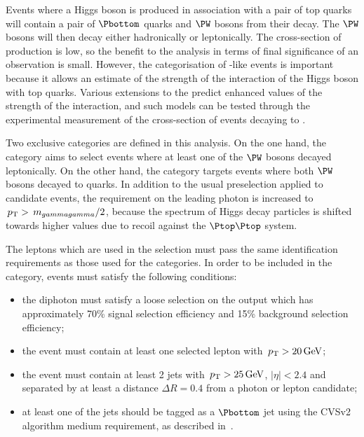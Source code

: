 Events where a Higgs boson is produced in association with a pair of top quarks will contain a pair of $\Pbottom$ quarks and $\PW$ bosons from their decay. The $\PW$ bosons will then decay either hadronically or leptonically. The cross-section of \ttH production is low, so the benefit to the analysis in terms of final significance of an observation is small. However, the categorisation of \ttH-like events is important because it allows an estimate of the strength of the interaction of the Higgs boson with top quarks. Various extensions to the \SM predict enhanced values of the strength of the \ttH interaction, and such models can be tested through the experimental measurement of the cross-section of \ttH events decaying to \Hgg.

Two exclusive \TTHTag categories are defined in this analysis. On the one hand, the \TTHLeptonicTag category aims to select \ttH events where at least one of the $\PW$ bosons decayed leptonically. On the other hand, the \TTHHadronicTag category targets events where both $\PW$ bosons decayed to quarks. In addition to the usual preselection applied to candidate events, the requirement on the leading photon \pT is increased to $\,p_\text{T}>\,m_{gammagamma}/2$, because the \pT spectrum of Higgs decay particles is shifted towards higher values due to recoil against the $\Ptop \Ptop$ system. %

The leptons which are used in the selection must pass the same identification requirements as those used for the \VHLeptonicTag categories. In order to be included in the \TTHLeptonicTag category, events must satisfy the following conditions:
\begin{itemize}
\item the diphoton must satisfy a loose selection on the \DiPhoBdt output which has approximately 70\% signal selection efficiency and 15\% background selection efficiency; 
\item the event must contain at least one selected lepton with $\,p_\text{T}>20\,\text{Ge\hspace{-.08em}V}$; %
\item the event must contain at least 2 jets with $\,p_\text{T}>25\,\text{Ge\hspace{-.08em}V}$, $|\eta|<2.4$ and separated by at least a distance $\Delta R=0.4$ from a photon or lepton candidate;
\item at least one of the jets should be tagged as a $\Pbottom$ jet using the CVSv2 algorithm medium requirement, as described in~\cite{bjets}.
\end{itemize}


